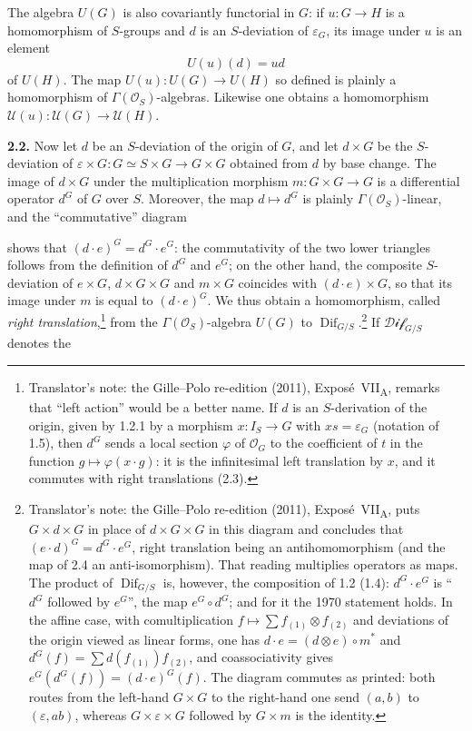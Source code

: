 The algebra \(U(G)\) is also covariantly functorial in \(G\): if
\(u:G\to H\) is a homomorphism of \(S\)-groups and \(d\) is an
\(S\)-deviation of \(\varepsilon_G\), its image under \(u\) is an
element
\[
  U(u)(d)=u d
\]
of \(U(H)\). The map \(U(u):U(G)\to U(H)\) so defined is plainly a
homomorphism of \(\Gamma(\mathcal O_S)\)-algebras. Likewise one obtains
a homomorphism
\(\mathcal U(u):\mathcal U(G)\to\mathcal U(H)\).

\medskip
\noindent\textbf{2.2.}
\label{sga3:VIIA:2.2}
Now let \(d\) be an \(S\)-deviation of the origin of \(G\), and let
\(d\times G\) be the \(S\)-deviation of
\(\varepsilon\times G:G\simeq S\times G\to G\times G\) obtained from
\(d\) by base change. The image of \(d\times G\) under the
multiplication morphism \(m:G\times G\to G\) is a differential operator
\(d^G\) of \(G\) over \(S\). Moreover, the map \(d\mapsto d^G\) is
plainly \(\Gamma(\mathcal O_S)\)-linear, and the ``commutative''
diagram
\begin{center}
  \label{sga3:VIIA:2.2-right-translation-associativity}
  
\end{center}
shows that \((d\cdot e)^G=d^G\cdot e^G\): the commutativity of the two
lower triangles follows from the definition of \(d^G\) and \(e^G\); on
the other hand, the composite \(S\)-deviation of \(e\times G\),
\(d\times G\times G\) and \(m\times G\) coincides with
\((d\cdot e)\times G\), so that its image under \(m\) is equal to
\((d\cdot e)^G\). We thus obtain a homomorphism, called \emph{right
translation},\footnote{Translator's note: the Gille--Polo re-edition
(2011), Expos\'e~VII\textsubscript{A}, remarks that ``left action''
would be a better name. If \(d\) is an \(S\)-derivation of the origin,
given by 1.2.1 by a morphism \(x:I_S\to G\) with \(xs=\varepsilon_G\)
(notation of 1.5), then \(d^G\) sends a local section \(\varphi\) of
\(\mathcal O_G\) to the coefficient of \(t\) in the function
\(g\mapsto\varphi(x\cdot g)\): it is the infinitesimal left
translation by \(x\), and it commutes with right translations (2.3).} from the \(\Gamma(\mathcal O_S)\)-algebra \(U(G)\) to
\(\operatorname{Dif}_{G/S}\).\footnote{Translator's note: the Gille--Polo
re-edition (2011), Expos\'e~VII\textsubscript{A}, puts
\(G\times d\times G\) in place of \(d\times G\times G\) in this diagram
and concludes that \((e\cdot d)^G=d^G\cdot e^G\), right translation
being an antihomomorphism (and the map of 2.4 an anti-isomorphism).
That reading multiplies operators as maps. The product of
\(\operatorname{Dif}_{G/S}\) is, however, the composition of 1.2
(1.4): \(d^G\cdot e^G\) is ``\(d^G\) followed by \(e^G\)'', the map
\(e^G\circ d^G\); and for it the 1970 statement holds. In the affine
case, with comultiplication \(f\mapsto\sum f_{(1)}\otimes f_{(2)}\) and
deviations of the origin viewed as linear forms, one has
\(d\cdot e=(d\otimes e)\circ m^*\) and
\(d^G(f)=\sum d(f_{(1)})f_{(2)}\), and coassociativity gives
\(e^G(d^G(f))=(d\cdot e)^G(f)\). The diagram commutes as printed: both
routes from the left-hand \(G\times G\) to the right-hand one send
\((a,b)\) to \((\varepsilon,ab)\), whereas \(G\times\varepsilon\times G\)
followed by \(G\times m\) is the identity.} If \(\mathcal{Dif}_{G/S}\) denotes the
